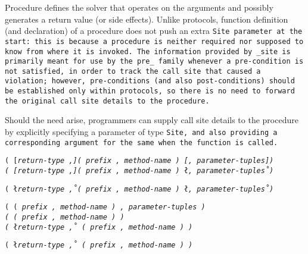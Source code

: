 \def\Subsection#1{\subsection{#1}}

Procedure defines the solver that operates on the arguments
and possibly generates a return value (or side effects).
Unlike protocols, function definition (and declaration) of a procedure does
not push an extra \tt{Site} parameter at the start: this is because a
procedure is neither required nor supposed to know from where it is invoked.
The information provided by \tt{_site} is primarily meant for use by
the \tt{pre_} family whenever a pre-condition is not satisfied, in order
to track the call site that caused a violation; however, pre-conditions
(and also post-conditions) should be established only within protocols,
so there is no need to forward the original call site details to the procedure.

\note Should the need arise, programmers can supply call site details to
the procedure by explicitly specifying a parameter of type \tt{Site}, and also
providing a corresponding argument for the same when the function is called.


\s\s\s\s\s\tt{(} [\it{return-type} \tt{,}]\s\tt{(} \it{prefix}
\tt{,} \it{method-name} \tt{)} [\tt{,} \it{parameter-tuples}]\s\tt{)}\\

\s\s\s\tt{(} [\it{return-type} \tt{,}]\s\tt{(} \it{prefix}
\tt{,} \it{method-name} \tt{)} \l\tt{,} \it{parameter-tuples}\r\s\tt{)}

\s\tt{(} \l\it{return-type} \tt{,}\r\s\tt{(}
\it{prefix} \tt{,} \it{method-name} \tt{)} \l\tt{,} \it{parameter-tuples}\r\s\tt{)}

\s\tt{(}   \tt{(} \it{prefix}
\tt{,} \it{method-name} \tt{)} \tt{,} \it{parameter-tuples} \tt{)}\\

\s\s\s\tt{(} \tt{(} \it{prefix}
\tt{,} \it{method-name} \tt{)} \tt{)}\\

\s\s\s\tt{(} \l\it{return-type} \tt{,}\r\s
\tt{(} \it{prefix} \tt{,} \it{method-name} \tt{)} \tt{)}

\s\tt{(} \l\it{return-type} \tt{,}\r\s
\tt{(} \it{prefix} \tt{,} \it{method-name} \tt{)} \tt{)}

